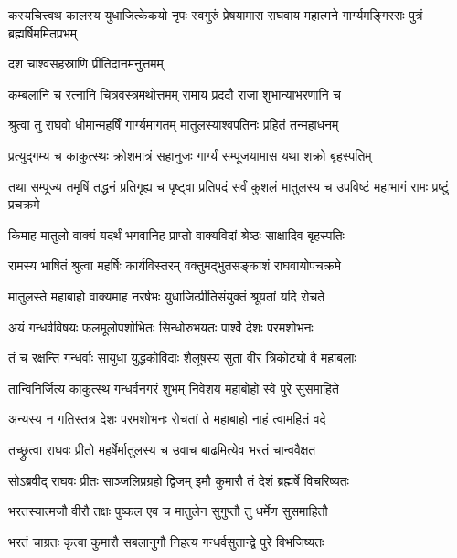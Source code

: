 
\threelineshloka
{कस्यचित्त्वथ कालस्य युधाजित्केकयो नृपः}
{स्वगुरुं प्रेषयामास राघवाय महात्मने}
{गार्ग्यमङ्गिरसः पुत्रं ब्रह्मर्षिममितप्रभम्} %

\onelineshloka
{दश चाश्वसहस्राणि प्रीतिदानमनुत्तमम्} %

\twolineshloka
{कम्बलानि च रत्नानि चित्रवस्त्रमथोत्तमम्}
{रामाय प्रददौ राजा शुभान्याभरणानि च} %

\twolineshloka
{श्रुत्वा तु राघवो धीमान्महर्षिं गार्ग्यमागतम्}
{मातुलस्याश्वपतिनः प्रहितं तन्महाधनम्} %

\twolineshloka
{प्रत्युद्गम्य च काकुत्स्थः क्रोशमात्रं सहानुजः}
{गार्ग्यं सम्पूजयामास यथा शक्रो बृहस्पतिम्} %

\threelineshloka
{तथा सम्पूज्य तमृषिं तद्धनं प्रतिगृह्य च}
{पृष्ट्वा प्रतिपदं सर्वं कुशलं मातुलस्य च}
{उपविष्टं महाभागं रामः प्रष्टुं प्रचक्रमे} %

\twolineshloka
{किमाह मातुलो वाक्यं यदर्थं भगवानिह}
{प्राप्तो वाक्यविदां श्रेष्ठः साक्षादिव बृहस्पतिः} %

\twolineshloka
{रामस्य भाषितं श्रुत्वा महर्षिः कार्यविस्तरम्}
{वक्तुमद्भुतसङ्काशं राघवायोपचक्रमे} %

\twolineshloka
{मातुलस्ते महाबाहो वाक्यमाह नरर्षभः}
{युधाजित्प्रीतिसंयुक्तं श्रूयतां यदि रोचते} %

\twolineshloka
{अयं गन्धर्वविषयः फलमूलोपशोभितः}
{सिन्धोरुभयतः पार्श्वे देशः परमशोभनः} %

\twolineshloka
{तं च रक्षन्ति गन्धर्वाः सायुधा युद्धकोविदाः}
{शैलूषस्य सुता वीर त्रिकोट्यो वै महाबलाः} %

\twolineshloka
{तान्विनिर्जित्य काकुत्स्थ गन्धर्वनगरं शुभम्}
{निवेशय महाबोहो स्वे पुरे सुसमाहिते} %

\twolineshloka
{अन्यस्य न गतिस्तत्र देशः परमशोभनः}
{रोचतां ते महाबाहो नाहं त्वामहितं वदे} %

\twolineshloka
{तच्छ्रुत्वा राघवः प्रीतो महर्षेर्मातुलस्य च}
{उवाच बाढमित्येव भरतं चान्ववैक्षत} %

\twolineshloka
{सोऽब्रवीद् राघवः प्रीतः साञ्जलिप्रग्रहो द्विजम्}
{इमौ कुमारौ तं देशं ब्रह्मर्षे विचरिष्यतः} %

\twolineshloka
{भरतस्यात्मजौ वीरौ तक्षः पुष्कल एव च}
{मातुलेन सुगुप्तौ तु धर्मेण सुसमाहितौ} %

\twolineshloka
{भरतं चाग्रतः कृत्वा कुमारौ सबलानुगौ}
{निहत्य गन्धर्वसुतान्द्वे पुरे विभजिष्यतः} %


